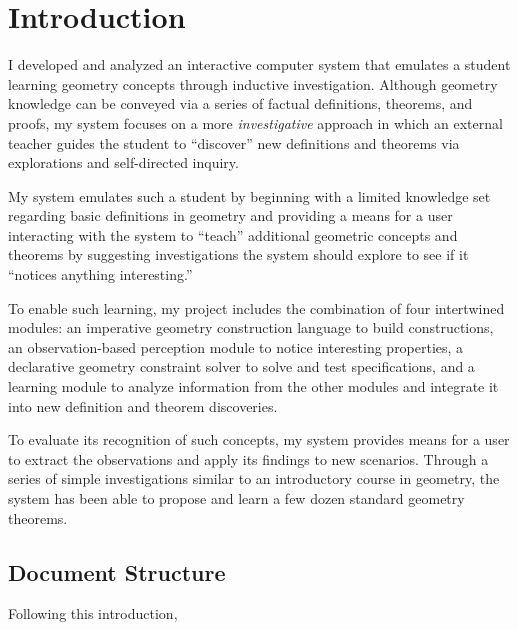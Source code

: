 \chapter{Introduction}
\label{chap:intro}

I developed and analyzed an interactive computer system that emulates
a student learning geometry concepts through inductive
investigation. Although geometry knowledge can be conveyed via a
series of factual definitions, theorems, and proofs, my system focuses
on a more \emph{investigative} approach in which an external teacher
guides the student to ``discover'' new definitions and theorems via
explorations and self-directed inquiry.

My system emulates such a student by beginning with a limited
knowledge set regarding basic definitions in geometry and providing a
means for a user interacting with the system to ``teach'' additional
geometric concepts and theorems by suggesting investigations the
system should explore to see if it ``notices anything interesting.''

To enable such learning, my project includes the combination of four
intertwined modules: an imperative geometry construction language to
build constructions, an observation-based perception module to notice
interesting properties, a declarative geometry constraint solver to
solve and test specifications, and a learning module to analyze
information from the other modules and integrate it into new
definition and theorem discoveries.

To evaluate its recognition of such concepts, my system provides means
for a user to extract the observations and apply its findings to new
scenarios.  Through a series of simple investigations similar to an
introductory course in geometry, the system has been able to propose
and learn a few dozen standard geometry theorems.

\section{Document Structure}

Following this introduction,

